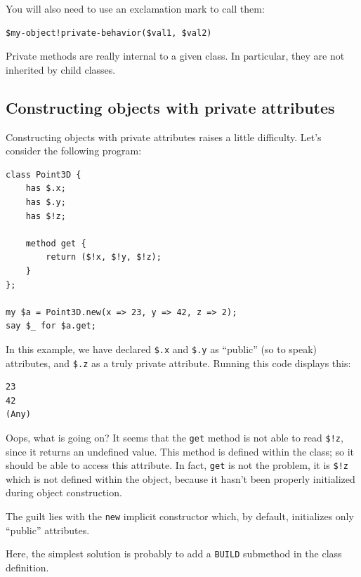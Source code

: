 You will also need to use an exclamation mark to call them:

\begin{verbatim}
$my-object!private-behavior($val1, $val2)
\end{verbatim}

Private methods are really internal to a given class. In 
particular, they are not inherited by child classes.


\subsection{Constructing objects with private attributes}

Constructing objects with private attributes raises a 
little difficulty. Let's consider the following program:

\begin{verbatim}
class Point3D {
    has $.x;
    has $.y;
    has $!z;
    
    method get {
        return ($!x, $!y, $!z);
    }
};

my $a = Point3D.new(x => 23, y => 42, z => 2);
say $_ for $a.get;
\end{verbatim}

In this example, we have declared \verb'$.x' and \verb'$.y' 
as ``public'' (so to speak) attributes, and \verb'$.z' as 
a truly private attribute. Running this code displays this:

\begin{verbatim}
23
42
(Any)
\end{verbatim}

Oops, what is going on? It seems that the {\tt get} 
method is not able to read \verb'$!z', since it returns 
an undefined value. This method is defined within the 
class; so it should be able to access this attribute. In 
fact, {\tt get} is not the problem, it is \verb'$!z' which is 
not defined within the object, because it hasn't been properly 
initialized during object construction.

The guilt lies with the {\tt new} implicit constructor which, 
by default, initializes only ``public'' attributes.

Here, the simplest solution is probably to add a {\tt BUILD} 
submethod in the class definition.

